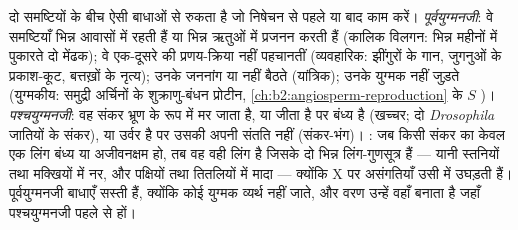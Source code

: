 \begin{proposition}[विलगन-क्रियाविधियाँ]\label{prop:b2:speciation:isolation}
दो समष्टियों के बीच  ऐसी बाधाओं से रुकता है जो
निषेचन से पहले या बाद काम करें। \emph{पूर्वयुग्मनजी}: वे समष्टियाँ
भिन्न आवासों में रहती हैं या भिन्न ऋतुओं में प्रजनन करती हैं (कालिक
विलगन: भिन्न महीनों में पुकारते दो मेंढक); वे एक-दूसरे की
प्रणय-क्रिया नहीं पहचानतीं (व्यवहारिक: झींगुरों के गान,
जुगनुओं के प्रकाश-कूट, बत्तख़ों के नृत्य); उनके
जननांग या  नहीं बैठते (यांत्रिक); उनके युग्मक नहीं
जुड़ते (युग्मकीय: समुद्री अर्चिनों के शुक्राणु-बंधन प्रोटीन,
\cref{ch:b2:angiosperm-reproduction} के $S$ )।
\emph{पश्चयुग्मनजी}: वह संकर भ्रूण के रूप में मर जाता है, या जीता है पर
बंध्य है (खच्चर; दो \emph{Drosophila} जातियों के संकर), या
उर्वर है पर उसकी अपनी संतति नहीं (संकर-भंग)।
\emph{}: जब किसी संकर का केवल एक लिंग बंध्य या
अजीवनक्षम हो, तब वह वही लिंग है जिसके दो भिन्न लिंग-गुणसूत्र हैं --- यानी
स्तनियों तथा मक्खियों में नर, और पक्षियों तथा तितलियों में मादा ---
क्योंकि X पर  असंगतियाँ उसी में उघड़ती हैं।
पूर्वयुग्मनजी बाधाएँ सस्ती हैं, क्योंकि कोई युग्मक व्यर्थ नहीं जाते, और
वरण उन्हें वहाँ बनाता है जहाँ पश्चयुग्मनजी पहले से हों।
\end{proposition}

